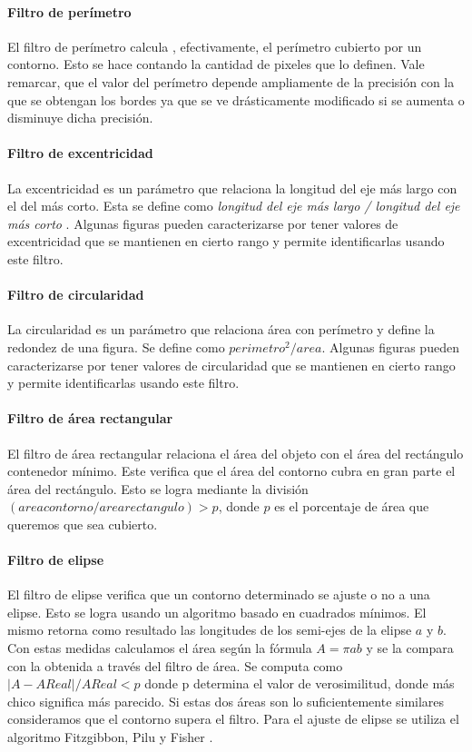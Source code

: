 	\paragraph{Filtro de perímetro}
	El filtro de perímetro calcula , efectivamente, el perímetro cubierto por un contorno. Esto se hace contando la cantidad de pixeles que lo definen.
	Vale remarcar, que el valor del perímetro depende ampliamente de la precisión con la que se obtengan los bordes ya que se ve drásticamente modificado 
	si se aumenta o disminuye dicha precisión.
	\paragraph{Filtro de excentricidad}
	La excentricidad es un parámetro que relaciona la longitud del eje más largo con el del más corto. Esta se define como 
	\textit { longitud del eje más largo / longitud del eje más corto}  . Algunas figuras pueden caracterizarse por tener valores de excentricidad
	que se mantienen en cierto rango y permite identificarlas usando este filtro.
	\paragraph{Filtro de circularidad}
	La circularidad es un parámetro que relaciona área con perímetro y define la redondez de una figura. Se define como $perimetro^2/area$. Algunas figuras pueden 
	caracterizarse por tener valores de circularidad que se mantienen en cierto rango y permite identificarlas usando este filtro.
	\paragraph{Filtro de área rectangular}
	El filtro de área rectangular relaciona el área del objeto con el área del rectángulo contenedor mínimo. Este verifica que el área
	del contorno cubra en gran parte el área del rectángulo. Esto se logra mediante la división $(area contorno / area rectangulo)> p$, donde 
	$p$ es el porcentaje de área que queremos que sea cubierto.
	\paragraph{Filtro de elipse}
	El filtro de elipse verifica que un contorno determinado se ajuste o no a una elipse. Esto se logra usando un algoritmo basado 
	en cuadrados mínimos. El mismo retorna como resultado las longitudes de los semi-ejes de la elipse $a$ y $b$. Con estas medidas calculamos
	el área según la fórmula $A=\pi a  b$ y se la compara con la 
	obtenida a través del filtro de área. Se computa como $|A-AReal|/ 
	AReal < p$ donde p determina el
	valor de verosimilitud, donde más chico significa más parecido. Si estas dos áreas son lo suficientemente similares consideramos que el contorno supera el filtro. 
	Para el ajuste de elipse se utiliza el algoritmo Fitzgibbon, Pilu y Fisher \cite{Fitzgibbon99}.
